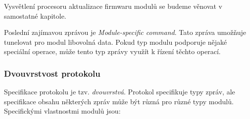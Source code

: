Vysvětlení procesoru aktualizace firmwaru modulů se budeme věnovat v samostatné
kapitole.

Poslední zajímavou zprávou je \textit{Module-specific command}. Tato zpráva
umožňuje tunelovat pro modul libovolná data. Pokud typ modulu podporuje nějaké
speciální operace, může tento typ zprávy využít k řízení těchto operací.


\subsubsection{Dvouvrstvost protokolu}

Specifikace protokolu je tzv. \textit{dvouvrstvá}. Protokol specifikuje typy
zpráv, ale specifikace obsahu některých zpráv může být různá pro různé typy
modulů. Specifickými vlastnostmi modulů jsou:

